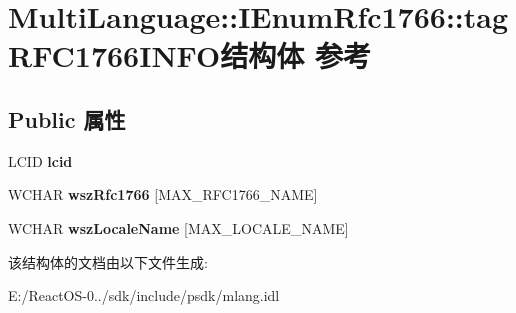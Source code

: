 \hypertarget{struct_multi_language_1_1_i_enum_rfc1766_1_1tag_r_f_c1766_i_n_f_o}{}\section{Multi\+Language\+:\+:I\+Enum\+Rfc1766\+:\+:tag\+R\+F\+C1766\+I\+N\+F\+O结构体 参考}
\label{struct_multi_language_1_1_i_enum_rfc1766_1_1tag_r_f_c1766_i_n_f_o}
\subsection*{Public 属性}
\begin{DoxyCompactItemize}
\item 
\mbox{\label{struct_multi_language_1_1_i_enum_rfc1766_1_1tag_r_f_c1766_i_n_f_o_a8a772c9dfb49466a634a25911147b889}} 
L\+C\+ID {\bfseries lcid}
\item 
\mbox{\label{struct_multi_language_1_1_i_enum_rfc1766_1_1tag_r_f_c1766_i_n_f_o_ac4b3db0151efa02a85523de3edf9cbb3}} 
W\+C\+H\+AR {\bfseries wsz\+Rfc1766} \mbox{[}M\+A\+X\+\_\+\+R\+F\+C1766\+\_\+\+N\+A\+ME\mbox{]}
\item 
\mbox{\label{struct_multi_language_1_1_i_enum_rfc1766_1_1tag_r_f_c1766_i_n_f_o_a7e824af378d01e3cc20fa9acdce54414}} 
W\+C\+H\+AR {\bfseries wsz\+Locale\+Name} \mbox{[}M\+A\+X\+\_\+\+L\+O\+C\+A\+L\+E\+\_\+\+N\+A\+ME\mbox{]}
\end{DoxyCompactItemize}


该结构体的文档由以下文件生成\+:\begin{DoxyCompactItemize}
\item 
E\+:/\+React\+O\+S-\/0../sdk/include/psdk/mlang.\+idl\end{DoxyCompactItemize}
